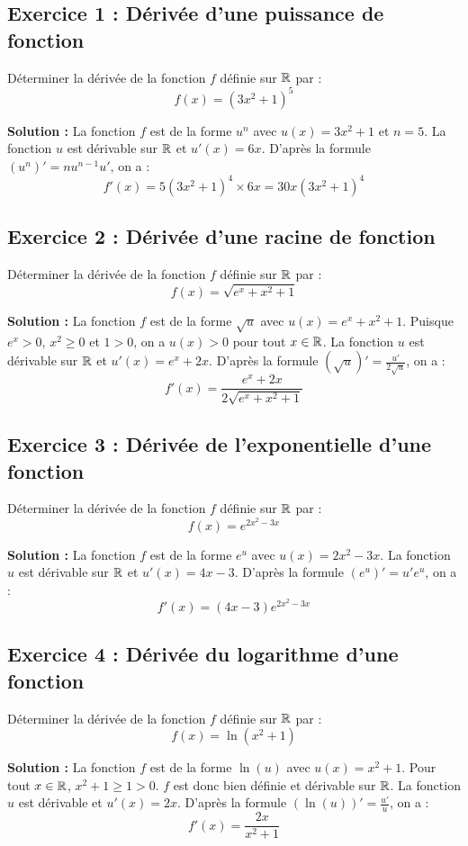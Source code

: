 \subsection*{Exercice 1 : Dérivée d'une puissance de fonction}
Déterminer la dérivée de la fonction $f$ définie sur $\mathbb{R}$ par :
\[
f(x) = (3x^2 + 1)^5
\]

\textbf{Solution :}
La fonction $f$ est de la forme $u^n$ avec $u(x) = 3x^2 + 1$ et $n = 5$.
La fonction $u$ est dérivable sur $\mathbb{R}$ et $u'(x) = 6x$.
D'après la formule $(u^n)' = n u^{n-1} u'$, on a :
\[
f'(x) = 5(3x^2 + 1)^4 \times 6x = 30x(3x^2 + 1)^4
\]

\subsection*{Exercice 2 : Dérivée d'une racine de fonction}
Déterminer la dérivée de la fonction $f$ définie sur $\mathbb{R}$ par :
\[
f(x) = \sqrt{e^x + x^2 + 1}
\]

\textbf{Solution :}
La fonction $f$ est de la forme $\sqrt{u}$ avec $u(x) = e^x + x^2 + 1$.
Puisque $e^x > 0$, $x^2 \ge 0$ et $1 > 0$, on a $u(x) > 0$ pour tout $x \in \mathbb{R}$.
La fonction $u$ est dérivable sur $\mathbb{R}$ et $u'(x) = e^x + 2x$.
D'après la formule $(\sqrt{u})' = \frac{u'}{2\sqrt{u}}$, on a :
\[
f'(x) = \frac{e^x + 2x}{2\sqrt{e^x + x^2 + 1}}
\]

\subsection*{Exercice 3 : Dérivée de l'exponentielle d'une fonction}
Déterminer la dérivée de la fonction $f$ définie sur $\mathbb{R}$ par :
\[
f(x) = e^{2x^2 - 3x}
\]

\textbf{Solution :}
La fonction $f$ est de la forme $e^u$ avec $u(x) = 2x^2 - 3x$.
La fonction $u$ est dérivable sur $\mathbb{R}$ et $u'(x) = 4x - 3$.
D'après la formule $(e^u)' = u' e^u$, on a :
\[
f'(x) = (4x - 3)e^{2x^2 - 3x}
\]

\subsection*{Exercice 4 : Dérivée du logarithme d'une fonction}
Déterminer la dérivée de la fonction $f$ définie sur $\mathbb{R}$ par :
\[
f(x) = \ln(x^2 + 1)
\]

\textbf{Solution :}
La fonction $f$ est de la forme $\ln(u)$ avec $u(x) = x^2 + 1$.
Pour tout $x \in \mathbb{R}$, $x^2 + 1 \ge 1 > 0$. $f$ est donc bien définie et dérivable sur $\mathbb{R}$.
La fonction $u$ est dérivable et $u'(x) = 2x$.
D'après la formule $(\ln(u))' = \frac{u'}{u}$, on a :
\[
f'(x) = \frac{2x}{x^2 + 1}
\]

